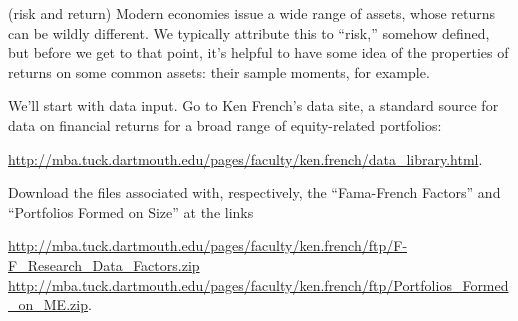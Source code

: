 \documentclass[11pt]{exam}
\begin{document}
\begin{questions}
\begin{solution}
\end{solution}


\question (risk and return)
Modern economies issue a wide range of assets,
whose returns can be wildly different.
We typically attribute this to ``risk,''
somehow defined,
but before we get to that point,
it's helpful to have some idea of the properties of
returns on some common assets:  their sample moments, for example.

We'll start with data input.  Go to Ken French's data site,
a standard source for data on financial returns for a broad range
of equity-related portfolios:

{\small
\url{http://mba.tuck.dartmouth.edu/pages/faculty/ken.french/data_library.html}}.

Download the files associated with, respectively, the ``Fama-French Factors''
and ``Portfolios Formed on Size'' at the links

{\small
\url{http://mba.tuck.dartmouth.edu/pages/faculty/ken.french/ftp/F-F_Research_Data_Factors.zip} \\
\url{http://mba.tuck.dartmouth.edu/pages/faculty/ken.french/ftp/Portfolios_Formed_on_ME.zip}.
}


\end{questions}
\end{document}
